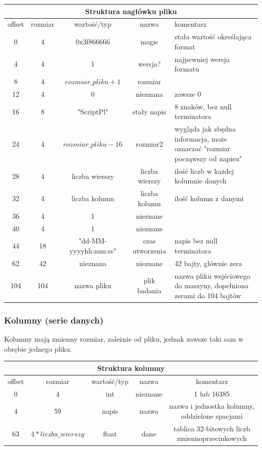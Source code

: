 \documentclass{article}
\begin{document}
	\begin{center}
		\begin{tabular}{|c|c|c|c|p{6.5cm}|} \hline
			\multicolumn{5}{|c|}{Struktura nagłówku pliku} \\\hline
			offset & rozmiar & wartość/typ & nazwa & komentarz \\\hline
			\hline
			 0 &  4 & 0x3f866666 & magic & stała wartość określająca format \\\hline
			 4 &  4 & 1 & wersja? & najpewniej wersja formatu \\\hline
			 8 &  4 & $rozmiar\_pliku + 1$ & rozmiar & \\\hline
			12 &  4 & 0 & nieznana & zawsze 0 \\\hline
			16 &  8 & "ScriptPl" & stały napis & 8 znaków, bez null terminatora \\\hline
			24 &  4 & $rozmiar\_pliku - 16$ & rozmiar2 & wygląda jak zbędna informacja, może oznaczać "rozmiar począwszy od napisu" \\\hline
			28 &  4 & liczba wierszy & liczba wierszy & ilość liczb w każdej kolumnie danych \\\hline
			32 &  4 & liczba kolumn & liczba kolumn & ilość kolumn z danymi \\\hline
			36 &  4 & 1 & nieznane & \\\hline
			40 &  4 & 1 & nieznane & \\\hline
			44 & 18 & "dd-MM-yyyyhh:mm:ss" & czas utworzenia & napis bez null terminatora \\\hline
			62 & 42 & nieznana & nieznane & 42 bajty, głównie zera \\\hline
			104 & 104 & nazwa pliku & plik badania & nazwa pliku wejściowego do maszyny, dopełniona zerami do 104 bajtów \\\hline
		\end{tabular}
	\end{center}
	
	\subsubsection{Kolumny (serie danych)}
	Kolumny mają zmienny rozmiar, zależnie od pliku, jednak zawsze taki sam w obrębie jednego pliku.
	
	\begin{center}
		\begin{tabular}{|c|c|c|c|c|} \hline
			\multicolumn{5}{|c|}{Struktura kolumny} \\\hline
			offset & rozmiar & wartość/typ & nazwa & komentarz \\\hline
			\hline
			0 & 4 & int & nieznane & 1 lub 16385  \\\hline
			4 & 59 & napis & nazwa & nazwa i jednostka kolumny, oddzielone spacjami \\\hline
			63 & $4 * liczba\_wierszy$ & float & dane & tablica 32-bitowych liczb zmiennoprzecinkowych \\\hline
		\end{tabular}
	\end{center}
	
\end{document}
